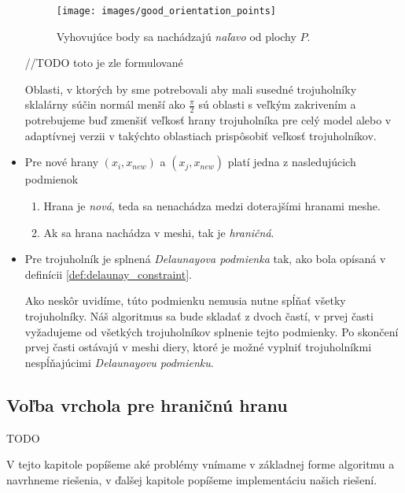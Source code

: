 \begin{itemize}
{        \begin{figure}
            \centerline{\texttt{[image: images/good\_orientation\_points]}}
            \caption[]{Vyhovujúce body sa nachádzajú \textit{naľavo} od plochy $P$.}
            \label{obr:good_orientation_points}
        \end{figure}


        //TODO toto je zle formulované

        Oblasti, v ktorých by sme potrebovali aby mali susedné trojuholníky sklalárny súčin normál menší ako 
        $\frac{\pi}{2}$ sú oblasti s veľkým zakrivením a potrebujeme buď zmenšiť veľkosť hrany trojuholníka
        pre celý model alebo v adaptívnej verzii v takýchto oblastiach prispôsobiť veľkosť trojuholníkov. 
    }

     \item{
         Pre nové hrany $(x_i, x_{new})$ a $(x_j, x_{new})$ platí jedna z nasledujúcich podmienok
         \begin{enumerate}
            \item {
                Hrana je \textit{nová}, teda sa nenachádza medzi doterajšími hranami meshe. 
            }
            \item {
                Ak sa hrana nachádza v meshi, tak je \textit{hraničná}.
            }
         \end{enumerate}
     }

     \item{
         Pre trojuholník je splnená \textit{Delaunayova podmienka} tak, ako bola opísaná v 
         definícii \ref{def:delaunay_constraint}.

        Ako neskôr uvidíme, túto podmienku nemusia nutne spĺňať všetky trojuholníky. Náš algoritmus sa bude 
        skladať z dvoch častí, v prvej časti vyžadujeme od všetkých trojuholníkov splnenie tejto podmienky.
        Po skončení prvej časti ostávajú v meshi diery, ktoré je možné vyplniť trojuholníkmi nespĺňajúcimi 
        \textit{Delaunayovu podmienku}. 
     }
\end{itemize}

\subsection{Voľba vrchola pre hraničnú hranu}

TODO


V tejto kapitole popíšeme aké problémy vnímame v základnej forme algoritmu a navrhneme riešenia, v 
ďalšej kapitole popíšeme implementáciu našich riešení. 

